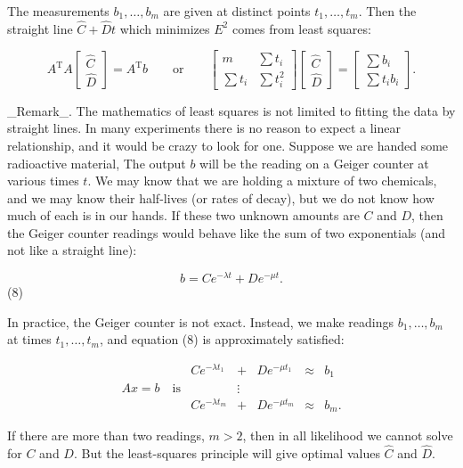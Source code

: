 The measurements \(b_{1},\ldots,b_{m}\) are given at distinct points \(t_{1},\ldots,t_{m}\). Then the straight line \(\widehat{C}+\widehat{D}t\) which minimizes \(E^{2}\) comes from least squares:

\[A^{\mathrm{T}}A\begin{bmatrix}\widehat{C}\\ \widehat{D}\end{bmatrix}=A^{\mathrm{T}}b\qquad\text{or}\qquad\begin{bmatrix} m&\sum t_{i}\\ \sum t_{i}&\sum t_{i}^{2}\end{bmatrix}\begin{bmatrix}\widehat{C}\\ \widehat{D}\end{bmatrix}=\begin{bmatrix}\sum b_{i}\\ \sum t_{i}b_{i}\end{bmatrix}.\]

_Remark_. The mathematics of least squares is not limited to fitting the data by straight lines. In many experiments there is no reason to expect a linear relationship, and it would be crazy to look for one. Suppose we are handed some radioactive material, The output \(b\) will be the reading on a Geiger counter at various times \(t\). We may know that we are holding a mixture of two chemicals, and we may know their half-lives (or rates of decay), but we do not know how much of each is in our hands. If these two unknown amounts are \(C\) and \(D\), then the Geiger counter readings would behave like the sum of two exponentials (and not like a straight line):

\[b=Ce^{-\lambda t}+De^{-\mu t}.\] (8)

In practice, the Geiger counter is not exact. Instead, we make readings \(b_{1},\ldots,b_{m}\) at times \(t_{1},\ldots,t_{m}\), and equation (8) is approximately satisfied:

\[\begin{array}{ccccc}&Ce^{-\lambda t_{1}}&+&De^{-\mu t_{1}}&\approx&b_{1}\\ Ax=b\quad\text{is}&&\vdots&&\\ &Ce^{-\lambda t_{m}}&+&De^{-\mu t_{m}}&\approx&b_{m}.\end{array}\]

If there are more than two readings, \(m>2\), then in all likelihood we cannot solve for \(C\) and \(D\). But the least-squares principle will give optimal values \(\widehat{C}\) and \(\widehat{D}\).


